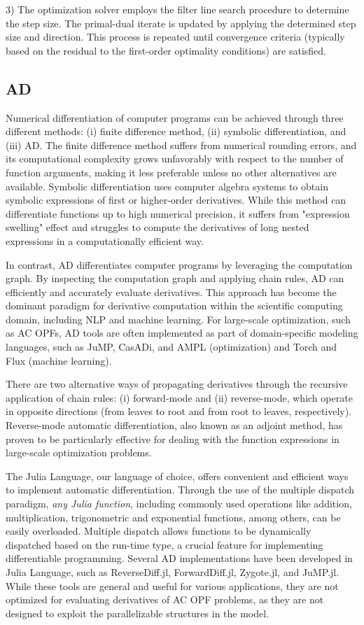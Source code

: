 3) The optimization solver employs the filter line search procedure to
determine the step size. The primal-dual iterate is updated by
applying the determined step size and direction. This process is
repeated until convergence criteria (typically based on the residual
to the first-order optimality conditions) are satisfied.

\subsection{AD}
Numerical differentiation of computer programs can be achieved through
three different methods: (i) finite difference method, (ii) symbolic
differentiation, and (iii) AD. The finite difference method suffers
from numerical rounding errors, and its computational complexity grows
unfavorably with respect to the number of function arguments, making
it less preferable unless no other alternatives are
available. Symbolic differentiation uses computer algebra systems to
obtain symbolic expressions of first or higher-order
derivatives. While this method can differentiate functions up to high
numerical precision, it suffers from "expression swelling" effect and
struggles to compute the derivatives of long nested expressions in a
computationally efficient way.

In contrast, AD differentiates computer
programs by leveraging the computation graph. By inspecting the
computation graph and applying chain rules, AD
can efficiently and accurately evaluate derivatives. This approach has
become the dominant paradigm for derivative computation within the
scientific computing domain, including NLP and
machine learning. For large-scale optimization, such as AC OPFs, AD
tools are often implemented as part of domain-specific modeling
languages, such as JuMP, CasADi, and AMPL (optimization) and Torch and
Flux (machine learning).

There are two alternative ways of propagating derivatives through the
recursive application of chain rules: (i) forward-mode and (ii)
reverse-mode, which operate in opposite directions (from leaves to
root and from root to leaves, respectively). Reverse-mode automatic
differentiation, also known as an adjoint method, has proven to be
particularly effective for dealing with the function expressions in
large-scale optimization problems.

The Julia Language, our language of choice, offers convenient and
efficient ways to implement automatic differentiation. Through the use
of the multiple dispatch paradigm, \textit{any Julia function},
including commonly used operations like addition, multiplication,
trigonometric and exponential functions, among others, can be easily
overloaded. Multiple dispatch allows functions to be dynamically
dispatched based on the run-time type, a crucial feature for
implementing differentiable programming. Several AD implementations
have been developed in Julia Language, such as ReverseDiff.jl,
ForwardDiff.jl, Zygote.jl, and JuMP.jl. While these tools are general
and useful for various applications, they are not optimized for
evaluating derivatives of AC OPF problems, as they are not designed to
exploit the parallelizable structures in the model.


